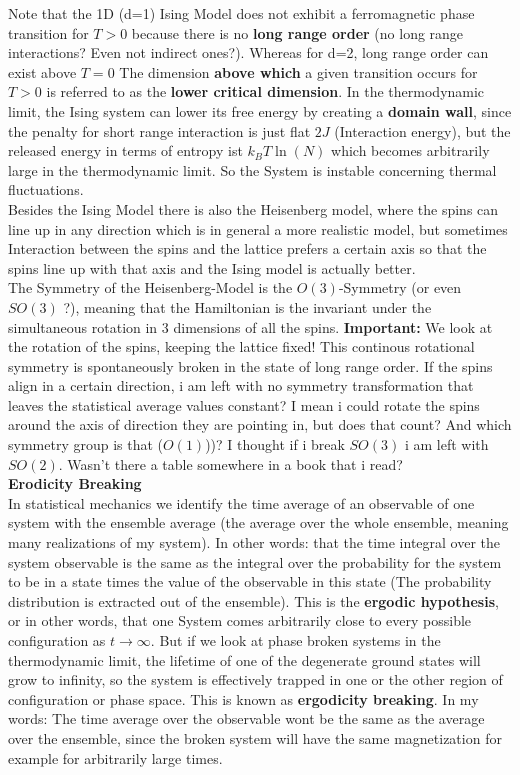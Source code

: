 		Note that the 1D (d=1) Ising Model does not exhibit a ferromagnetic phase transition for $T > 0$ because there is no \textbf{long range order} (no long range interactions? Even not indirect ones?). Whereas for d=2, long range order can exist above $ T = 0$ The dimension \textbf{above which} a given transition occurs for $T > 0$ is referred to as the \textbf{lower critical dimension}. In the thermodynamic limit, the Ising system can lower its free energy by creating a \textbf{domain wall}, since the penalty for short range interaction is just flat $2J$ (Interaction energy), but the released energy in terms of entropy ist $k_B T \ln(N)$ which becomes arbitrarily large in the thermodynamic limit. So the System is instable concerning thermal fluctuations. \\
		
		Besides the Ising Model there is also the Heisenberg model, where the spins can line up in any direction which is in general a more realistic model, but sometimes Interaction between the spins and the lattice prefers a certain axis so that the spins line up with that axis and the Ising model is actually better. \\
		
		The Symmetry of the Heisenberg-Model is the $O(3)$-Symmetry (or even $SO(3)$ ?), meaning that the Hamiltonian is the invariant under the simultaneous rotation in 3 dimensions of all the spins. \textbf{Important:} We look at the rotation of the spins, keeping the lattice fixed! This continous rotational symmetry is spontaneously broken in the state of long range order. If the spins align in a certain direction, i am left with no symmetry transformation that leaves the statistical average values constant? I mean i could rotate the spins around the axis of direction they are pointing in, but does that count? And which symmetry group is that ($O(1)$))? I thought if i break $SO(3)$ i am left with $SO(2)$. Wasn't there a table somewhere in a book that i read? \\
		
		\textbf{Erodicity Breaking} \\
		In statistical mechanics we identify the time average of an observable of one system with the ensemble average (the average over the whole ensemble, meaning many realizations of my system). In other words: that the time integral over the system observable is the same as the integral over the probability for the system to be in a state times the value of the observable in this state (The probability distribution is extracted out of the ensemble). This is the \textbf{ergodic hypothesis}, or in other words, that one System comes arbitrarily close to every possible configuration as $t \rightarrow \infty$. But if we look at phase broken systems in the thermodynamic limit, the lifetime of one of the degenerate ground states will grow to infinity, so the system is effectively trapped in one or the other region of configuration or phase space. This is known as \textbf{ergodicity breaking}. In my words: The time average over the observable wont be the same as the average over the ensemble, since the broken system will have the same magnetization for example for arbitrarily large times. \\
		
